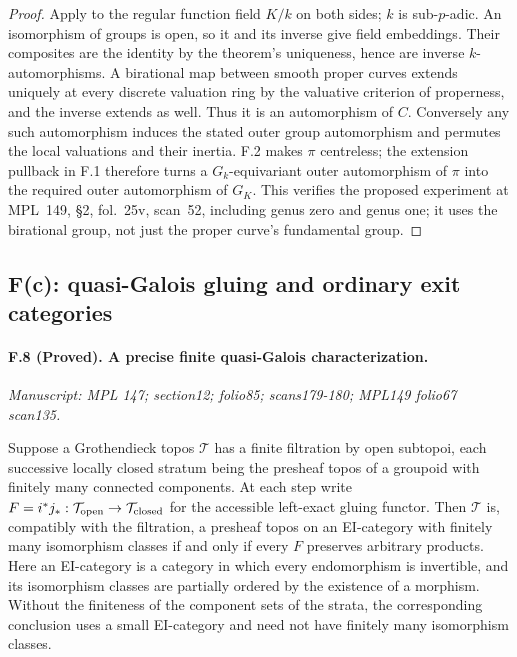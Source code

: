 \begin{proof}
Apply \cite[Theorem~B, Theorem~17.1 in the body]{Mochizuki1999} to the
regular function field $K/k$ on both sides; $k$ is sub-$p$-adic. An
isomorphism of groups is open, so it and its inverse give field embeddings.
Their composites are the identity by the theorem's uniqueness, hence
are inverse $k$-automorphisms. A birational map between smooth proper
curves extends uniquely at every discrete valuation ring by the valuative
criterion of properness, and the inverse extends as well. Thus it is an
automorphism of $C$. Conversely any such automorphism induces the stated
outer group automorphism and permutes the local valuations and their
inertia. F.2 makes $\pi$ centreless; the extension pullback in F.1 therefore
turns a $G_k$-equivariant outer automorphism of $\pi$ into the required
outer automorphism of $G_K$. This verifies the proposed experiment at
MPL~149, \S2, fol.~25v, scan~52, including genus zero and genus one; it uses the
birational group, not just the proper curve's fundamental group.
\end{proof}

\subsection{F(c): quasi-Galois gluing and ordinary exit categories}

\paragraph{F.8 (Proved). A precise finite quasi-Galois characterization.}
\textit{Manuscript: MPL 147; section12; folio85; scans179-180; MPL149 folio67 scan135.}

Suppose a Grothendieck topos $\mathcal T$ has a finite filtration by open
subtopoi, each successive locally closed stratum being the presheaf topos
of a groupoid with finitely many connected components. At each step write
$F=i^*j_*:\mathcal T_{\rm open}\to\mathcal T_{\rm closed}$ for the
accessible left-exact gluing functor. Then $\mathcal T$ is, compatibly with
the filtration, a presheaf topos on an EI-category with finitely many
isomorphism classes if and only if every $F$ preserves arbitrary products.
Here an EI-category is a category in which every endomorphism is
invertible, and its isomorphism classes are partially ordered by the
existence of a morphism. Without the finiteness of the component sets of
the strata, the corresponding conclusion uses a small EI-category and
need not have finitely many isomorphism classes.

